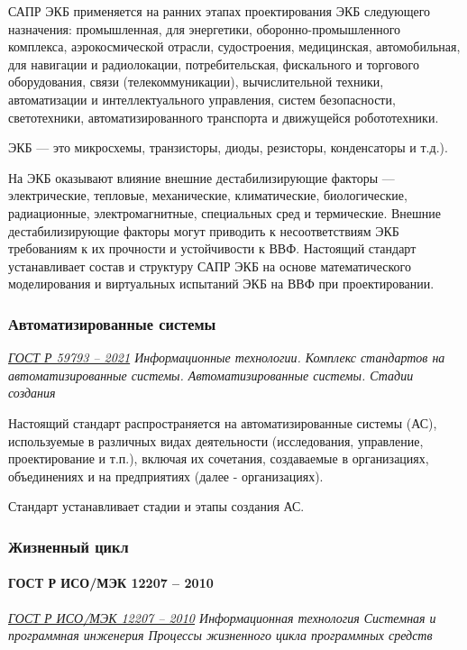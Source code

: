 САПР ЭКБ применяется на ранних этапах проектирования ЭКБ следующего назначения:
промышленная, для энергетики, оборонно-промышленного комплекса,
аэрокосмической отрасли, судостроения, медицинская, автомобильная,
для навигации и радиолокации, потребительская, фискального
и торгового оборудования, связи (телекоммуникации), вычислительной техники,
автоматизации и интеллектуального управления, систем безопасности,
светотехники, автоматизированного транспорта и движущейся робототехники.

ЭКБ --- это микросхемы, транзисторы, диоды, резисторы, конденсаторы и т.д.).

На ЭКБ оказывают влияние внешние дестабилизирующие факторы --- электрические,
тепловые, механические, климатические, биологические, радиационные,
электромагнитные, специальных сред и термические.
Внешние дестабилизирующие факторы могут приводить
к несоответствиям ЭКБ требованиям к их прочности и устойчивости к ВВФ.
Настоящий стандарт устанавливает состав
и структуру САПР ЭКБ на основе математического моделирования
и виртуальных испытаний ЭКБ на ВВФ при проектировании.

\subsubsection{Автоматизированные системы}

\emph{\href{https://docs.cntd.ru/document/1200181349}{ГОСТ Р 59793 -- 2021}
Информационные технологии.
Комплекс стандартов на автоматизированные системы.
Автоматизированные системы. Стадии создания
}

Настоящий стандарт распространяется на автоматизированные системы (АС),
используемые в различных видах деятельности
(исследования, управление, проектирование и т.п.),
включая их сочетания, создаваемые в организациях,
объединениях и на предприятиях (далее - организациях).

Стандарт устанавливает стадии и этапы создания АС.

\subsubsection{Жизненный цикл}

\paragraph{ГОСТ Р ИСО/МЭК 12207 -- 2010}

\emph{\href{https://docs.cntd.ru/document/1200082859}
{ГОСТ Р ИСО/МЭК 12207 -- 2010}
Информационная технология
Системная и программная инженерия
Процессы жизненного цикла программных средств
}

